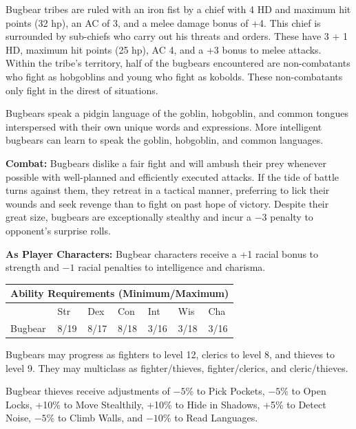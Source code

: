 \begin{multicols}{2}
Bugbear tribes are ruled with an iron fist by a chief with 4 HD and maximum hit points (32 hp), an AC of 3, and a melee damage bonus of +4. This chief is surrounded by sub-chiefs who carry out his threats and orders. These have 3 + 1 HD, maximum hit points (25 hp), AC 4, and a +3 bonus to melee attacks. Within the tribe's territory, half of the bugbears encountered are non-combatants who fight as hobgoblins and young who fight as kobolds. These non-combatants only fight in the direst of situations.

Bugbears speak a pidgin language of the goblin, hobgoblin, and common tongues interspersed with their own unique words and expressions. More intelligent bugbears can learn to speak the goblin, hobgoblin, and common languages.

\textbf{Combat:} Bugbears dislike a fair fight and will ambush their prey whenever possible with well-planned and efficiently executed attacks. If the tide of battle turns against them, they retreat in a tactical manner, preferring to lick their wounds and seek revenge than to fight on past hope of victory. Despite their great size, bugbears are exceptionally stealthy and incur a $-3$ penalty to opponent's surprise rolls. 

\textbf{As Player Characters:} Bugbear characters receive a +1 racial bonus to strength and $-1$ racial penalties to intelligence and charisma.

\noindent \begin{minipage}{\columnwidth}

\noindent \begin{tabular}{|p{}|p{}|p{}|p{}|p{}|p{}|p{}|}
\multicolumn{7}{c}{Ability Requirements (Minimum/Maximum)} \\
\hline
	& Str	& Dex	& Con	& Int	& Wis	& Cha	\\
\hline\hline
\rowcolor[gray]{.9}Bugbear	& 8/19	& 8/17	& 8/18	& 3/16	& 3/18	& 3/16	\\
\hline
\end{tabular}

\end{minipage}

Bugbears may progress as fighters to level 12, clerics to level 8, and thieves to level 9. They may multiclass as fighter/thieves, fighter/clerics, and cleric/thieves.

Bugbear thieves receive adjustments of $-5$\% to Pick Pockets, $-5$\% to Open Locks, +10\% to Move Stealthily, +10\% to Hide in Shadows, +5\% to Detect Noise, $-5$\% to Climb Walls, and $-10$\% to Read Languages.


\end{multicols}

